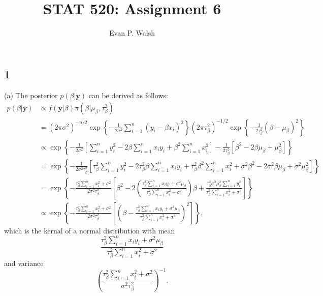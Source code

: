 \documentclass[12pt]{article}
\title{STAT 520: Assignment 6}
\author{Evan P. Walsh}
\begin{document}
\maketitle

\subsection*{1} (a) The posterior $p(\beta|\bm{y})$ can be derived as follows:
\begin{align*}
  p(\beta|\bm{y}) & \propto f(\bm{y}|\beta)\pi(\beta|\mu_{\beta}, \tau_{\beta}^{2}) \\
  & = (2\pi \sigma^{2})^{-n/2}\exp\left\{ -\frac{1}{2\sigma^{2}}\sum_{i=1}^{n}(y_i - \beta x_i)^{2} \right\}(2\pi \tau_{\beta}^{2})^{-1/2}\exp\left\{
  -\frac{1}{2\tau_{\beta}^{2}}(\beta - \mu_{\beta})^{2} \right\} \\
  & \propto\exp\left\{ -\frac{1}{2\sigma^{2}}\left[ \sum_{i=1}^{n}y_i^2 - 2\beta\sum_{i=1}^{n}x_i y_i + \beta^{2}\sum_{i=1}^{n}x_i^2 \right] - 
  \frac{1}{2\tau_{\beta}^{2}}\left[ \beta^{2} - 2\beta \mu_{\beta} + \mu_{\beta}^{2} \right]\right\} \\
  & = \exp\left\{ -\frac{1}{2\sigma^{2}\tau_{\beta}^{2}}\left[ \tau_{\beta}^{2}\sum_{i=1}^{n}y_i^2 - 2\tau_{\beta}^2\beta \sum_{i=1}^{n}x_i y_i + 
    \tau_{\beta}^2\beta^2\sum_{i=1}^{n}x_i^2 + \sigma^2\beta^2 - 2\sigma^2\beta\mu_{\beta} + \sigma^2\mu_{\beta}^2\right] \right\} \\
    & = \exp\left\{ -\frac{\tau_{\beta}^{2}\sum_{i=1}^{n}x_i^2 + \sigma^{2}}{2\sigma^{2}\tau_{\beta}^{2}}\left[ \beta^{2} - 
    2\left( \frac{\tau_{\beta}^2\sum_{i=1}^{n}x_i y_i + \sigma^{2}\mu_{\beta}}{\tau_{\beta}^2\sum_{i=1}^{n}x_i^2 + \sigma^2} \right)\beta + 
\frac{\tau_{\beta}^2\sigma^2\mu_{\beta}^2\sum_{i=1}^n y_i^2}{\tau_{\beta}^2\sum_{i=1}^{n}x_i^2 + \sigma^2}\right] \right\} \\
    & \propto \exp\left\{ -\frac{\tau_{\beta}^{2}\sum_{i=1}^{n}x_i^2 + \sigma^{2}}{2\sigma^{2}\tau_{\beta}^{2}}\left[ \left(\beta - 
    \frac{\tau_{\beta}^2\sum_{i=1}^{n}x_i y_i + \sigma^{2}\mu_{\beta}}{\tau_{\beta}^2\sum_{i=1}^{n}x_i^2 + \sigma^2} \right)^{2}\right] \right\},
\end{align*}
which is the kernal of a normal distribution with mean 
\begin{equation}
  \frac{\tau_{\beta}^2\sum_{i=1}^{n}x_i y_i + \sigma^{2}\mu_{\beta}}{\tau_{\beta}^2\sum_{i=1}^{n}x_i^2 + \sigma^2}
  \label{1.1}
\end{equation}
and variance
\begin{equation}
  \left(\frac{\tau_{\beta}^{2}\sum_{i=1}^{n}x_i^2 + \sigma^{2}}{\sigma^{2}\tau_{\beta}^{2}}\right)^{-1}.
  \label{1.2}
\end{equation}
\end{document}
